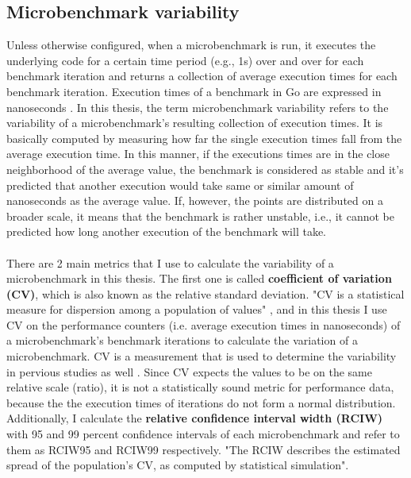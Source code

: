 \documentclass{seal_thesis}
\begin{document}
\subsection{Microbenchmark variability}
\label{Microbenchmark variability}

Unless otherwise configured, when a microbenchmark is run, it executes the underlying code for a certain time period (e.g., 1s) over and over for each benchmark iteration and returns a collection of average execution times for each benchmark iteration\cite{laaber2019software}. Execution times of a benchmark in Go are expressed in nanoseconds \cite{laaber2019software} \cite{costa2019}. In this thesis, the term microbenchmark variability refers to the variability of a microbenchmark's resulting collection of execution times. It is basically computed by measuring how far the single execution times fall from the average execution time. In this manner, if the executions times are in the close neighborhood of the average value, the benchmark is considered as stable and it's predicted that another execution would take same or similar amount of nanoseconds as the average value. If, however, the points are distributed on a broader scale, it means that the benchmark is rather unstable, i.e., it cannot be predicted how long another execution of the benchmark will take.\\
\\
There are 2 main metrics that I use to calculate the variability of a microbenchmark in this thesis. The first one is called \textbf{coefficient of variation (CV)}, which is also known as the relative standard deviation\cite{laaber2019software}. "CV is a statistical measure for dispersion among a population of values" \cite{laaber2019software}, and in this thesis I use CV on the performance counters (i.e. average execution times in nanoseconds) of a microbenchmark's benchmark iterations to calculate the variation of a microbenchmark. CV is a measurement that is used to determine the variability in pervious studies as well \cite{laaber2019software} \cite{Leitner:2016:PCS:2926746.2885497}. Since CV expects the values to be on the same relative scale (ratio), it is not a statistically sound metric for performance data, because the the execution times of iterations do not form a normal distribution. Additionally, I calculate the \textbf{relative confidence interval width (RCIW)} with 95 and 99 percent confidence intervals of each microbenchmark and refer to them as RCIW95 and RCIW99 respectively. "The RCIW describes the estimated spread of the population's CV, as computed by statistical simulation"\cite{laaber2019software}.\\
\end{document}
